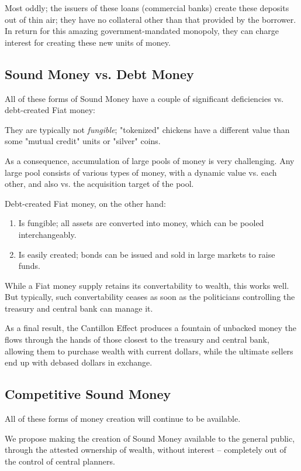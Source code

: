 \documentclass[11pt]{article}
\begin{document}
Most oddly; the issuers of these loans (commercial banks) create these deposits out of thin air;
they have no collateral other than that provided by the borrower.  In return for this amazing
government-mandated monopoly, they can charge interest for creating these new units of money.

\subsection{Sound Money vs. Debt Money}
\label{sec:org63801a0}

All of these forms of Sound Money have a couple of significant deficiencies vs. debt-created Fiat money:

They are typically not \emph{fungible}; "tokenized" chickens have a different value than some "mutual
credit" units or "silver" coins.

As a consequence, accumulation of large pools of money is very challenging.  Any large pool
consists of various types of money, with a dynamic value vs. each other, and also vs. the
acquisition target of the pool.

Debt-created Fiat money, on the other hand:
\begin{enumerate}
\item Is fungible; all assets are converted into money, which can be pooled interchangeably.
\item Is easily created; bonds can be issued and sold in large markets to raise funds.
\end{enumerate}

While a Fiat money supply retains its convertability to wealth, this works well.  But typically,
such convertability ceases as soon as the politicians controlling the treasury and central bank
can manage it.

As a final result, the Cantillon Effect produces a fountain of unbacked money the flows through
the hands of those closest to the treasury and central bank, allowing them to purchase wealth
with current dollars, while the ultimate sellers end up with debased dollars in exchange.

\subsection{Competitive Sound Money}
\label{sec:orgb98c24b}

All of these forms of money creation will continue to be available.

We propose making the creation of Sound Money available to the general public, through the
attested ownership of wealth, without interest -- completely out of the control of central
planners.
\end{document}

